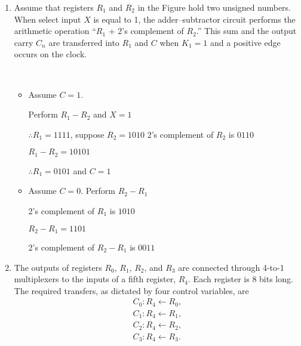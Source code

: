 \documentclass{zc-ust-hw}
\begin{document}
\maketitle

\begin{enumerate}

  \item Assume that registers $R_1$ and $R_{2}$ in the Figure hold two unsigned
    numbers. When select input $X$ is equal to 1, the adder–subtractor circuit
    performs the arithmetic operation ``$R_{1}$ + 2's complement of \(R_{2}\).''
    This sum and the output carry $C_n$ are transferred into $R_1$ and $C$ when
    $K_1 = 1$ and a positive edge occurs on the clock. 

    \begin{sol}\,
      \begin{itemize}
        \item Assume \( C=1 \).

      Perform \(R_{1}-R_{2}\) and $X=1$ 

      \( \therefore R_{1}=1111 \),\hspace{1em} suppose \( R_{2}=1010 \)
      2's complement of \( R_{2} \) is \( 0110 \)
      
      \( R_{1}-R_{2}=10101 \)
      
      \( \therefore R_{1}=0101 \) and \( C=1 \)


    \item Assume \( C=0 \).
      Perform \(R_{2}-R_{1}\)

      2's complement of \( R_{1} \) is \( 1010 \)

      \( R_{2}-R_{1}=1101 \)

      2's complement of \( R_{2}-R_{1} \) is \( 0011 \)

  
      \end{itemize}
    \end{sol}

  \item The outputs of registers $R_0$, $R_1$, $R_2$, and $R_3$ are connected through
    4-to-1 multiplexers to the inputs of a fifth register, $R_4$. Each register is
    8 bits long. The required transfers, as dictated by four control variables,
    are 
    \begin{align*}
      C_{0}: R_{4} \leftarrow R_{0}, \\
      C_{1}: R_{4} \leftarrow R_{1}, \\
      C_{2}: R_{4} \leftarrow R_{2}, \\
      C_{3}: R_{4} \leftarrow R_{3}
    .\end{align*}
    

\end{enumerate}
\end{document}

